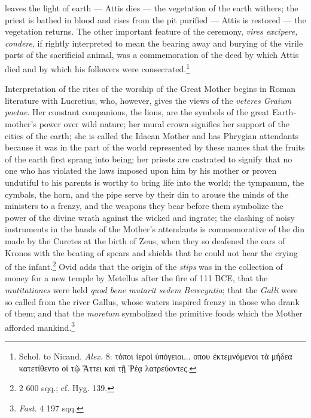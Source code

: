 \documentclass[a4paper, 11pt, oneside, polutonikogreek, french]{article}
\begin{document}
leaves the light of earth --- Attis dies --- the vegetation of the earth withers; the priest is bathed in blood and rises from the pit purified --- Attis is restored --- the vegetation returns. The other important feature of the ceremony, \emph{vires excipere, condere}, if rightly interpreted to mean the bearing away and burying of the virile parts of the sacrificial animal, was a commemoration of the deed by which Attis died and by which his followers were consecrated.\footnote{Schol. to Nicand. \emph{Alex.} 8: τόποι ἱεροὶ ὑπόγειοι... οπου ἐκτεμνόμενοι τὰ μήδεα κατετίθεντο οἱ τῷ Ἄττει καὶ τῇ Ῥέᾳ λατρεύοντες.}

Interpretation of the rites of the worship of the Great Mother begins in Roman literature with Lucretius, who, however, gives the views of the \emph{veteres Graium poetae}. Her constant companions, the lions, are the symbols of the great Earth-mother's power over wild nature; her mural crown signifies her support of the cities of the earth; she is called the Idaean Mother and has Phrygian attendants because it was in the part of the world represented by these names that the fruits of the earth first sprang into being; her priests are castrated to signify that no one who has violated the laws imposed upon him by his mother or proven undutiful to his parents is worthy to bring life into the world; the tympanum, the cymbals, the horn, and the pipe serve by their din to arouse the minds of the ministers to a frenzy, and the weapons they bear before them symbolize the power of the divine wrath against the wicked and ingrate; the clashing of noisy instruments in the hands of the Mother's attendants is commemorative of the din made by the Curetes at the birth of Zeus, when they so deafened the ears of Kronos with the beating of spears and shields that he could not hear the crying of the infant.\footnote{2 600 sqq.; cf. Hyg. 139.} Ovid adds that the origin of the \emph{stips} was in the collection of money for a new temple by Metellus after the fire of 111 \textsc{BCE}, that the \emph{mutitationes} were held \emph{quod bene mutarit sedem Berecyntia}; that the \emph{Galli} were so called from the river Gallus, whose waters inspired frenzy in those who drank of them; and that the \emph{moretum} symbolized the primitive foods which the Mother afforded mankind.\footnote{\emph{Fast.} 4 197 sqq.}
\end{document}
